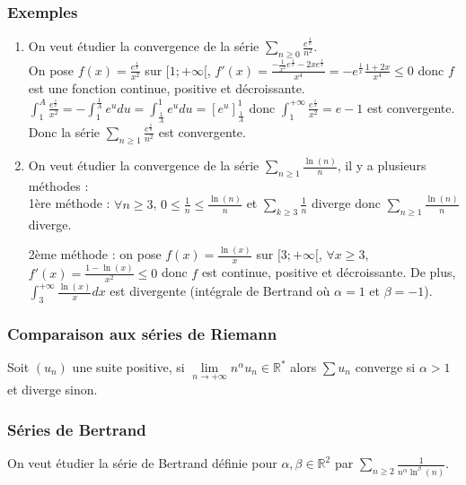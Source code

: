 \documentclass[a4paper,10pt]{book} %
\newcommand{\R}{\mathbb{R}}
\newcommand{\displayAmath}{\displaystyle}
\begin{document}
\subsubsection{Exemples}
\begin{enumerate}
\item On veut étudier la convergence de la série $\displayAmath\sum_{n\geq 0}\frac{e^{\frac{1}{n}}}{n^2}$.\\
On pose $\displayAmath f(x)=\frac{e^{\frac{1}{x}}}{x^2}$ sur $[1;+\infty[$, $\displayAmath f'(x)=\frac{-\frac{1}{x^2}e^{\frac{1}{x}}-2xe^{\frac{1}{x}}}{x^4} =-e^{\frac{1}{x}}\frac{1+2x}{x^4} \leq 0$
donc $f$ est une fonction continue, positive et décroissante.\\

$\displayAmath \int_1^A\frac{e^{\frac{1}{x}}}{x^2}=-\int_1^{\frac{1}{A}}e^udu=\int_{\frac{1}{A}}^{1}e^udu=\left[e^u\right]_{\frac{1}{A}}^1$ donc $\displayAmath \int_1^{+\infty}\frac{e^{\frac{1}{x}}}{x^2}=e-1$ est convergente.\\

Donc la série $\displayAmath \sum_{n\geq 1}\frac{e^\frac{1}{n}}{n^2}$ est convergente.

\item On veut étudier la convergence de la série $\displayAmath \sum_{n\geq 1}\frac{\ln(n)}{n}$, il y a plusieurs méthodes :\\

1ère méthode : $\forall n\geq 3$, $\displayAmath 0\leq \frac{1}{n}\leq \frac{\ln(n)}{n}$ et 
$\displayAmath \sum_{k\geq 3} \frac{1}{n}$ diverge donc $\displayAmath \sum_{n\geq 1}\frac{\ln(n)}{n}$ diverge.

2ème méthode :
on pose $\displayAmath f(x)=\frac{\ln(x)}{x}$ sur $[3;+\infty[$, $\forall x\geq 3$, $\displayAmath f'(x)=\frac{1-\ln(x)}{x^2}\leq 0$ donc $f$ est continue, positive et décroissante.
De plus, $\displayAmath \int_3^{+\infty}\frac{\ln(x)}{x}dx$ est divergente (intégrale de Bertrand où $\alpha=1$ et $\beta=-1$).
\end{enumerate}

\subsubsection{Comparaison aux séries de Riemann}
Soit $(u_n)$ une suite positive, si $\lim\limits_{n\rightarrow+\infty}n^\alpha u_n\in\R^*$ alors $\sum u_n$ converge si $\alpha>1$ et diverge sinon.

\subsubsection{Séries de Bertrand}
On veut étudier la série de Bertrand définie pour $\alpha,\beta \in\R^2$ par $\sum_{n\geq 2}\frac{1}{n^\alpha \ln^\beta(n)}$.\\\\
\end{document}
